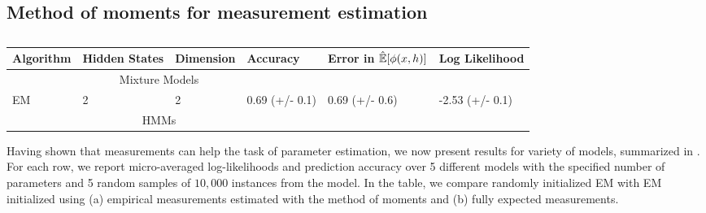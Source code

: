 
\subsection{Method of moments for measurement estimation}

\begin{table}
    \label{tab:errors}
    \begin{tabular}{l | l l | l l l }
        Algorithm & Hidden States & Dimension & Accuracy & Error in $\hat {\mathbb{E}}[\phi(x,h)]$ & Log Likelihood \\ \hline
        & \multicolumn{2}{|c|}{Mixture Models} & & & \\ \hline
        EM & 2 & 2 & 0.69 (+/- 0.1) & 0.69 (+/- 0.6) & -2.53 (+/- 0.1) \\
        & \multicolumn{2}{|c|}{HMMs} & & & \\ \hline
% 
% 
    \end{tabular}
    \caption{}
\end{table}

Having shown that measurements can help the task of parameter estimation, we now present results for variety of models, summarized in .
For each row, we report micro-averaged log-likelihoods and prediction accuracy over 5 different models with the specified number of parameters and 5 random samples of $10,000$ instances from the model. 
In the table, we compare randomly initialized EM with EM initialized using (a) empirical measurements estimated with the method of moments and (b) fully expected measurements.

